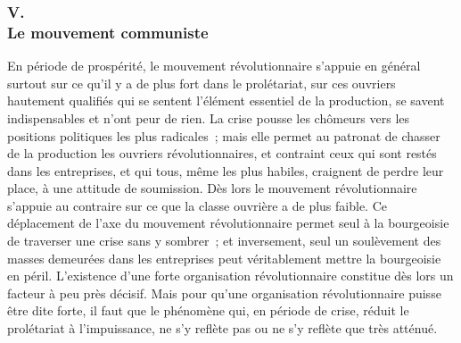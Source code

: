\documentclass[french,twoside]{book} %
\begin{document}
\subsubsection[V. Le mouvement communiste]{V. \\
Le mouvement communiste}
\noindent En période de prospérité, le mouvement révolutionnaire s'appuie en général surtout sur ce qu'il y a de plus fort dans le prolétariat, sur ces ouvriers hautement qualifiés qui se sentent l'élément essentiel de la production, se savent indispensables et n'ont peur de rien. La crise pousse les chômeurs vers les positions politiques les plus radicales ; mais elle permet au patronat de chasser de la production les ouvriers révolutionnaires, et contraint ceux qui sont restés dans les entreprises, et qui tous, même les plus habiles, craignent de perdre leur place, à une attitude de soumission. Dès lors le mouvement révolutionnaire s'appuie au contraire sur ce que la classe ouvrière a de plus faible. Ce déplacement de l'axe du mouvement révolutionnaire permet seul à la bourgeoisie de traverser une crise sans y sombrer ; et inversement, seul un soulèvement des masses demeurées dans les entreprises peut véritablement mettre la bourgeoisie en péril. L'existence d'une forte organisation révolution­naire constitue dès lors un facteur à peu près décisif. Mais pour qu'une organisation révolutionnaire puisse être dite forte, il faut que le phénomène qui, en période de crise, réduit le prolétariat à l'impuissance, ne s'y reflète pas ou ne s'y reflète que très atténué.\par
\end{document}
